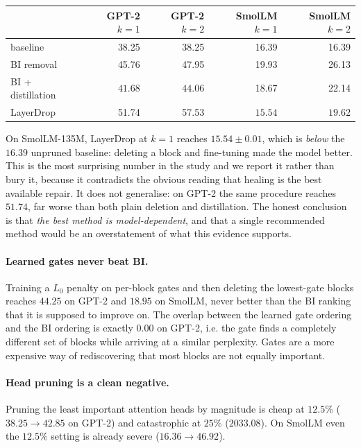 \documentclass[11pt]{article}
\begin{document}
\begin{center}
\begin{small}
\begin{tabular}{lrrrr}
\toprule
& GPT-2 $k{=}1$ & GPT-2 $k{=}2$ & SmolLM $k{=}1$ & SmolLM $k{=}2$ \\
\midrule
baseline & 38.25 & 38.25 & 16.39 & 16.39 \\
BI removal & 45.76 & 47.95 & 19.93 & 26.13 \\
BI + distillation & $\mathbf{41.68}$ & $\mathbf{44.06}$ & 18.67 & 22.14 \\
LayerDrop & 51.74 & 57.53 & $\mathbf{15.54}$ & $\mathbf{19.62}$ \\
\bottomrule
\end{tabular}
\end{small}
\end{center}

On SmolLM-135M, LayerDrop at $k=1$ reaches $15.54 \pm 0.01$, which is
\emph{below} the $16.39$ unpruned baseline: deleting a block and fine-tuning
made the model better. This is the most surprising number in the study and we
report it rather than bury it, because it contradicts the obvious reading that
healing is the best available repair. It does not generalise: on GPT-2 the
same procedure reaches $51.74$, far worse than both plain deletion and
distillation. The honest conclusion is that \emph{the best method is
model-dependent}, and that a single recommended method would be an
overstatement of what this evidence supports.

\paragraph{Learned gates never beat BI.} Training a $L_0$ penalty on
per-block gates and then deleting the lowest-gate blocks reaches $44.25$ on
GPT-2 and $18.95$ on SmolLM, never better than the BI ranking that it is
supposed to improve on. The overlap between the learned gate ordering and the
BI ordering is exactly $0.00$ on GPT-2, i.e. the gate finds a completely
different set of blocks while arriving at a similar perplexity. Gates are a
more expensive way of rediscovering that most blocks are not equally
important.

\paragraph{Head pruning is a clean negative.} Pruning the least important
attention heads by magnitude is cheap at $12.5\%$ ($38.25\rightarrow42.85$ on
GPT-2) and catastrophic at $25\%$ ($2033.08$). On SmolLM even the $12.5\%$
setting is already severe ($16.36\rightarrow46.92$).
\end{document}
